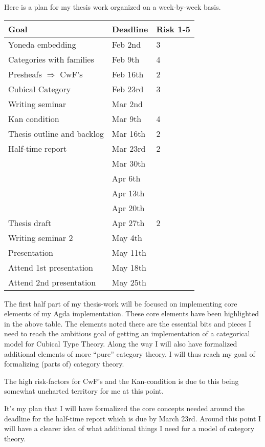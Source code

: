 Here is a plan for my thesis work organized on a week-by-week basis.
%
\begin{center}
\centering
\begin{tabular}{@{}lll@{}}
Goal                           & Deadline    & Risk  1-5        \\ \hline
Yoneda embedding               & Feb 2nd     & 3  \\
Categories with families       & Feb 9th     & 4  \\
Presheafs $\Rightarrow$ CwF's  & Feb 16th    & 2  \\
Cubical Category               & Feb 23rd    & 3  \\
Writing seminar                & Mar 2nd     &    \\
Kan condition                  & Mar 9th     & 4  \\
Thesis outline and backlog     & Mar 16th    & 2  \\
Half-time report               & Mar 23rd    & 2  \\
                               & Mar 30th    &    \\
                               & Apr 6th     &    \\
                               & Apr 13th    &    \\
                               & Apr  20th   &    \\
Thesis draft                   & Apr 27th    & 2  \\
Writing seminar 2              & May 4th     &    \\
Presentation                   & May 11th    &    \\
Attend 1st presentation        & May 18th    &    \\
Attend 2nd presentation        & May 25th    &    \\
\end{tabular}
\end{center}
%
The first half part of my thesis-work will be focused on implementing core
elements of my Agda implementation. These core elements have been highlighted in
the above table. The elements noted there are the essential bits and pieces I
need to reach the ambitious goal of getting an implementation of a categorical
model for Cubical Type Theory. Along the way I will also have formalized
additional elements of more ``pure'' category theory. I will thus reach my goal
of formalizing (parts of) category theory.

The high risk-factors for CwF's and the Kan-condition is due to this being
somewhat uncharted territory for me at this point.

It's my plan that I will have formalized the core concepts needed around the
deadline for the half-time report which is due by March 23rd. Around this point
I will have a clearer idea of what additional things I need for a model of
category theory.
